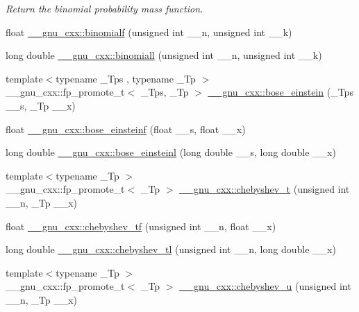 \begin{DoxyCompactItemize}
\begin{DoxyCompactList}\small\item\em Return the binomial probability mass function. \end{DoxyCompactList}\item 
float \hyperlink{group__gnu__math__spec__func_ga3882a077dacc6e627ca48abc05d7db48}{\+\_\+\+\_\+gnu\+\_\+cxx\+::binomialf} (unsigned int \+\_\+\+\_\+n, unsigned int \+\_\+\+\_\+k)
\item 
long double \hyperlink{group__gnu__math__spec__func_ga57602195f9215f735793c11d3210ac93}{\+\_\+\+\_\+gnu\+\_\+cxx\+::binomiall} (unsigned int \+\_\+\+\_\+n, unsigned int \+\_\+\+\_\+k)
\item 
{\footnotesize template$<$typename \+\_\+\+Tps , typename \+\_\+\+Tp $>$ }\\\+\_\+\+\_\+gnu\+\_\+cxx\+::fp\+\_\+promote\+\_\+t$<$ \+\_\+\+Tps, \+\_\+\+Tp $>$ \hyperlink{group__gnu__math__spec__func_gae8135b6861a48f2cee2e692093a17102}{\+\_\+\+\_\+gnu\+\_\+cxx\+::bose\+\_\+einstein} (\+\_\+\+Tps \+\_\+\+\_\+s, \+\_\+\+Tp \+\_\+\+\_\+x)
\item 
float \hyperlink{group__gnu__math__spec__func_gac1fb313fba5639d4168b6ee682507688}{\+\_\+\+\_\+gnu\+\_\+cxx\+::bose\+\_\+einsteinf} (float \+\_\+\+\_\+s, float \+\_\+\+\_\+x)
\item 
long double \hyperlink{group__gnu__math__spec__func_ga995c3ff580f81afb139f9cd50f445b48}{\+\_\+\+\_\+gnu\+\_\+cxx\+::bose\+\_\+einsteinl} (long double \+\_\+\+\_\+s, long double \+\_\+\+\_\+x)
\item 
{\footnotesize template$<$typename \+\_\+\+Tp $>$ }\\\+\_\+\+\_\+gnu\+\_\+cxx\+::fp\+\_\+promote\+\_\+t$<$ \+\_\+\+Tp $>$ \hyperlink{group__gnu__math__spec__func_ga4d9cae9de13a64ceeb4fb0226f4b7844}{\+\_\+\+\_\+gnu\+\_\+cxx\+::chebyshev\+\_\+t} (unsigned int \+\_\+\+\_\+n, \+\_\+\+Tp \+\_\+\+\_\+x)
\item 
float \hyperlink{group__gnu__math__spec__func_gab8cdb55702d9c8b85af4ecc3d8c6a134}{\+\_\+\+\_\+gnu\+\_\+cxx\+::chebyshev\+\_\+tf} (unsigned int \+\_\+\+\_\+n, float \+\_\+\+\_\+x)
\item 
long double \hyperlink{group__gnu__math__spec__func_ga0c421700d244cdf58e3ac5ff267664d1}{\+\_\+\+\_\+gnu\+\_\+cxx\+::chebyshev\+\_\+tl} (unsigned int \+\_\+\+\_\+n, long double \+\_\+\+\_\+x)
\item 
{\footnotesize template$<$typename \+\_\+\+Tp $>$ }\\\+\_\+\+\_\+gnu\+\_\+cxx\+::fp\+\_\+promote\+\_\+t$<$ \+\_\+\+Tp $>$ \hyperlink{group__gnu__math__spec__func_gafa90c06bdedb8459f20576297cf1608f}{\+\_\+\+\_\+gnu\+\_\+cxx\+::chebyshev\+\_\+u} (unsigned int \+\_\+\+\_\+n, \+\_\+\+Tp \+\_\+\+\_\+x)

\end{DoxyCompactItemize}
